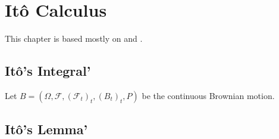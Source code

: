 \section{Itô Calculus}

This chapter is based mostly on \citet{baldi2017introduction} and \citet{oksendal2013stochastic}.

\subsection{Itô's Integral'}

Let $B = (\Omega, \mathcal F, (\mathcal F_t)_t, (B_t)_t, P)$ be the continuous Brownian motion.

\subsection{Itô's Lemma'}
